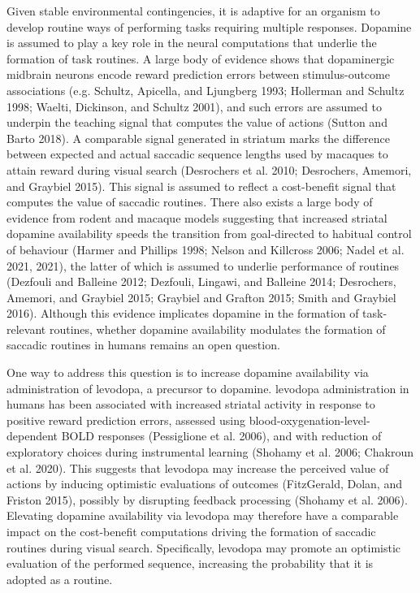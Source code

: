 \documentclass{article}
\begin{document}
Given stable environmental contingencies, it is adaptive for an organism
to develop routine ways of performing tasks requiring multiple
responses. Dopamine is assumed to play a key role in the neural
computations that underlie the formation of task routines. A large body
of evidence shows that dopaminergic midbrain neurons encode reward
prediction errors between stimulus-outcome associations (e.g. Schultz,
Apicella, and Ljungberg 1993; Hollerman and Schultz 1998; Waelti,
Dickinson, and Schultz 2001), and such errors are assumed to underpin
the teaching signal that computes the value of actions (Sutton and Barto
2018). A comparable signal generated in striatum marks the difference
between expected and actual saccadic sequence lengths used by macaques
to attain reward during visual search (Desrochers et al. 2010;
Desrochers, Amemori, and Graybiel 2015). This signal is assumed to
reflect a cost-benefit signal that computes the value of saccadic
routines. There also exists a large body of evidence from rodent and
macaque models suggesting that increased striatal dopamine availability
speeds the transition from goal-directed to habitual control of
behaviour (Harmer and Phillips 1998; Nelson and Killcross 2006; Nadel et
al. 2021, 2021), the latter of which is assumed to underlie performance
of routines (Dezfouli and Balleine 2012; Dezfouli, Lingawi, and Balleine
2014; Desrochers, Amemori, and Graybiel 2015; Graybiel and Grafton 2015;
Smith and Graybiel 2016). Although this evidence implicates dopamine in
the formation of task-relevant routines, whether dopamine availability
modulates the formation of saccadic routines in humans remains an open
question.

One way to address this question is to increase dopamine availability
via administration of levodopa, a precursor to dopamine. levodopa
administration in humans has been associated with increased striatal
activity in response to positive reward prediction errors, assessed
using blood-oxygenation-level-dependent BOLD responses (Pessiglione et
al. 2006), and with reduction of exploratory choices during instrumental
learning (Shohamy et al. 2006; Chakroun et al. 2020). This suggests that
levodopa may increase the perceived value of actions by inducing
optimistic evaluations of outcomes (FitzGerald, Dolan, and Friston
2015), possibly by disrupting feedback processing (Shohamy et al. 2006).
Elevating dopamine availability via levodopa may therefore have a
comparable impact on the cost-benefit computations driving the formation
of saccadic routines during visual search. Specifically, levodopa may
promote an optimistic evaluation of the performed sequence, increasing
the probability that it is adopted as a routine.
\end{document}
